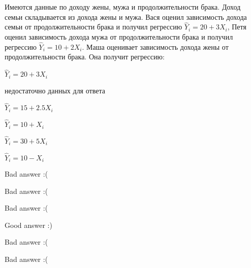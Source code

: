 
\begin{question}
Имеются данные по доходу жены, мужа и продолжительности брака. Доход семьи складывается из дохода жены и мужа. Вася оценил зависимость дохода семьи от продолжительности брака и получил регрессию \(\hat Y_i  = 20 + 3X_i\), Петя оценил зависимость дохода мужа от продолжительности брака и получил регрессию \(\hat Y_i  = 10 + 2X_i\). Маша оценивает зависимость дохода жены от продолжительности брака. Она получит регрессию:
\begin{answerlist}
  \item \(\hat Y_i  = 20+3X_i\)
  \item недостаточно данных для ответа
  \item \(\hat Y_i  = 15+2.5X_i\)
  \item \(\hat Y_i  = 10+X_i\)
  \item \(\hat Y_i  = 30+5X_i\)
  \item \(\hat Y_i  = 10-X_i\)
\end{answerlist}
\end{question}

\begin{solution}
\begin{answerlist}
  \item Bad answer :(
  \item Bad answer :(
  \item Bad answer :(
  \item Good answer :)
  \item Bad answer :(
  \item Bad answer :(
\end{answerlist}
\end{solution}

